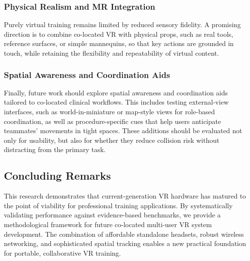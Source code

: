 \subsubsection{Physical Realism and MR Integration}
Purely virtual training remains limited by reduced sensory fidelity. A promising direction is to combine co-located VR with physical props, such as real tools, reference surfaces, or simple mannequins, so that key actions are grounded in touch, while retaining the flexibility and repeatability of virtual content.

\subsubsection{Spatial Awareness and Coordination Aids}
Finally, future work should explore spatial awareness and coordination aids tailored to co-located clinical workflows. This includes testing external-view interfaces, such as world-in-miniature or map-style views for role-based coordination, as well as procedure-specific cues that help users anticipate teammates' movements in tight spaces. These additions should be evaluated not only for usability, but also for whether they reduce collision risk without distracting from the primary task.


\subsection{Concluding Remarks}

This research demonstrates that current-generation VR hardware has matured to the point of viability for professional training applications. By systematically validating performance against evidence-based benchmarks, we provide a methodological framework for future co-located multi-user VR system development. The combination of affordable standalone headsets, robust wireless networking, and sophisticated spatial tracking enables a new practical foundation for portable, collaborative VR training.
